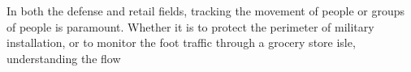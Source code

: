 



In both the defense and retail fields, tracking the movement of people or groups of people is paramount. Whether it is to protect the perimeter of military installation, or to monitor the foot traffic through a grocery store isle, understanding the flow
	






